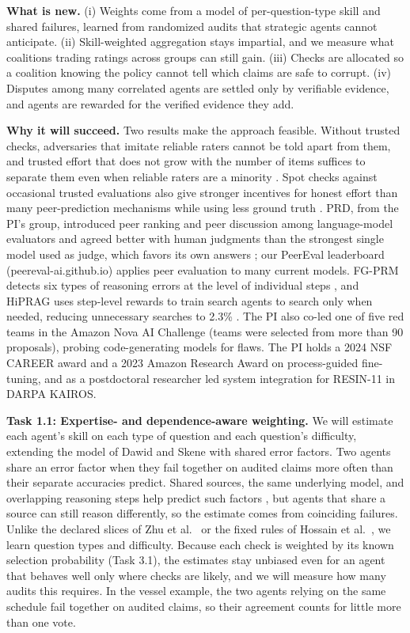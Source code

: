\documentclass[11pt,letterpaper]{article}
\newcommand{\rg}[1]{\par\vspace{1pt}{\normalfont\bfseries\itshape #1}\par}
\newcommand{\task}[1]{\textbf{#1}\hspace{0.4em}}
\begin{document}
\textbf{What is new.} (i) Weights come from a model of per-question-type skill and shared failures, learned from randomized audits that strategic agents cannot anticipate. (ii) Skill-weighted aggregation stays impartial, and we measure what coalitions trading ratings across groups can still gain. (iii) Checks are allocated so a coalition knowing the policy cannot tell which claims are safe to corrupt. (iv) Disputes among many correlated agents are settled only by verifiable evidence, and agents are rewarded for the verified evidence they add.

\textbf{Why it will succeed.} Two results make the approach feasible. Without trusted checks, adversaries that imitate reliable raters cannot be told apart from them, and trusted effort that does not grow with the number of items suffices to separate them even when reliable raters are a minority \cite{steinhardt2016avoiding}. Spot checks against occasional trusted evaluations also give stronger incentives for honest effort than many peer-prediction mechanisms while using less ground truth \cite{gao2019incentivizing}. PRD, from the PI's group, introduced peer ranking and peer discussion among language-model evaluators and agreed better with human judgments than the strongest single model used as judge, which favors its own answers \cite{li2024prd}; our PeerEval leaderboard (peereval-ai.github.io) applies peer evaluation to many current models. FG-PRM detects six types of reasoning errors at the level of individual steps \cite{li2025fgprm}, and HiPRAG uses step-level rewards to train search agents to search only when needed, reducing unnecessary searches to 2.3\% \cite{wu2026hiprag}. The PI also co-led one of five red teams in the Amazon Nova AI Challenge (teams were selected from more than 90 proposals), probing code-generating models for flaws. The PI holds a 2024 NSF CAREER award and a 2023 Amazon Research Award on process-guided fine-tuning, and as a postdoctoral researcher led system integration for RESIN-11 in DARPA KAIROS.

\rg{RG1. Learn whom to trust}
\task{Task 1.1: Expertise- and dependence-aware weighting.} We will estimate each agent's skill on each type of question and each question's difficulty, extending the model of Dawid and Skene \cite{dawid1979maximum,whitehill2009whose} with shared error factors. Two agents share an error factor when they fail together on audited claims more often than their separate accuracies predict. Shared sources, the same underlying model, and overlapping reasoning steps help predict such factors \cite{dong2009dependence,goel2025great}, but agents that share a source can still reason differently, so the estimate comes from coinciding failures. Unlike the declared slices of Zhu et al.\ \cite{zhu2026stopping} or the fixed rules of Hossain et al.\ \cite{hossain2026agreement}, we learn question types and difficulty. Because each check is weighted by its known selection probability (Task 3.1), the estimates stay unbiased even for an agent that behaves well only where checks are likely, and we will measure how many audits this requires. In the vessel example, the two agents relying on the same schedule fail together on audited claims, so their agreement counts for little more than one vote.
\end{document}
